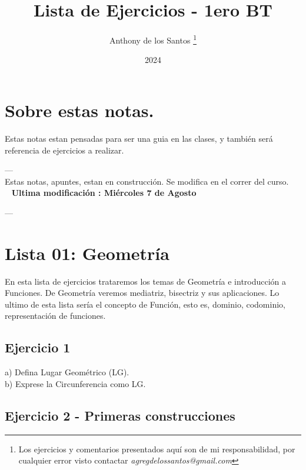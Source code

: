 \documentclass[11pt, a4paper]{article}
\title{ {\color{blue} Lista de Ejercicios - 1ero BT} }
\author{ Anthony de los Santos \footnote{ Los ejercicios y comentarios presentados aqu\'i son de mi responsabilidad, por cualquier
error visto contactar  \textit{agregdelossantos@gmail.com} } }
\date{ 2024 }
\begin{document}

\maketitle 

\newpage

\tableofcontents

\newpage



\vspace{20px}

\section{ Sobre estas notas. }

Estas notas estan pensadas para ser una guia en las clases, y tambi\'en ser\'a referencia 
de ejercicios a realizar. 

--- \\
Estas notas, apuntes, estan en construcci\'on. Se modifica en el correr del curso. ~ ~ \textbf{ {\color{red} Ultima modificaci\'on : Mi\'ercoles 7 de Agosto } }

--- \\

\section{ Lista 01: Geometr\'ia }

En esta lista de ejercicios trataremos los temas de Geometr\'ia e introducci\'on a Funciones. De Geometr\'ia veremos mediatriz, bisectriz y sus aplicaciones. Lo ultimo de esta lista ser\'ia el concepto de Funci\'on, esto es, dominio, codominio, representaci\'on de funciones. \\

\subsection*{ Ejercicio 1 }

a) Defina Lugar Geom\'etrico (LG). \\
b) Exprese la Circunferencia como LG. \\
\subsection*{ Ejercicio 2 - Primeras construcciones }
\end{document}
